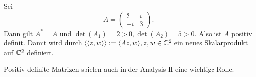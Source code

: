 \begin{beispiel}
	\label{bsp:5.13}
	Sei
	\[
		A = \begin{pmatrix}
			2 & i \\ -i & 3
		\end{pmatrix}.
	\]
	Dann gilt $A^* = A$ und $\det(A_1) = 2 >0, \det(A_2) = 5 > 0$.
	Also ist $A$ positiv definit.
	Damit wird durch $\sk{\sk{z,w}} := \sk{Az,w}, z,w \in \CC^2$ ein neues Skalarprodukt auf $\mathbb{C}^2$ definiert.
\end{beispiel}

\begin{bemerkung}
	\label{bem:5.14}
	Positiv definite Matrizen spielen auch in der Analysis II eine wichtige Rolle.
\end{bemerkung}
\cleardoubleoddemptypage